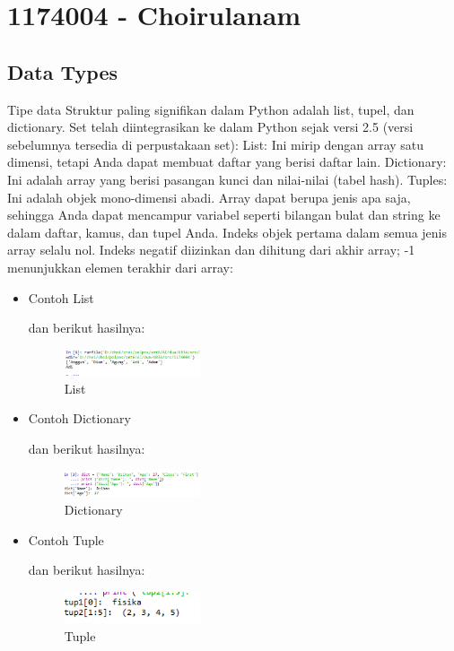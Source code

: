 \section{1174004 - Choirulanam}
\subsection{Data Types}
	\hfill\break
	Tipe data Struktur paling signifikan dalam Python adalah list, tupel, dan dictionary. Set telah diintegrasikan ke dalam Python sejak versi 2.5 (versi sebelumnya tersedia di perpustakaan set): List: Ini mirip dengan array satu dimensi, tetapi Anda dapat membuat daftar yang berisi daftar lain. Dictionary: Ini adalah array yang berisi pasangan kunci dan nilai-nilai (tabel hash). Tuples: Ini adalah objek mono-dimensi abadi. Array dapat berupa jenis apa saja, sehingga Anda dapat mencampur variabel seperti bilangan bulat dan string ke dalam daftar, kamus, dan tupel Anda. Indeks objek pertama dalam semua jenis array selalu nol. Indeks negatif diizinkan dan dihitung dari akhir array; -1 menunjukkan elemen terakhir dari array:

	\begin{itemize}
		\item Contoh List
		\hfill\break
	           
		\hfill\break
		dan berikut hasilnya:
		\begin{figure}[H]
		\includegraphics[width=4cm]{figures/kelompok1/1/anam/list.png}
		\centering
		\caption{List}
		\end{figure}

		\item Contoh Dictionary
		\hfill\break
	           
		\hfill\break
		dan berikut hasilnya:
		\begin{figure}[H]
		\includegraphics[width=4cm]{figures/kelompok1/1/anam/dict.png}
		\centering
		\caption{Dictionary}
		\end{figure}

		\item Contoh Tuple
		\hfill\break
	           
		\hfill\break
		dan berikut hasilnya:
		\begin{figure}[H]
		\includegraphics[width=4cm]{figures/kelompok1/1/anam/tupl.png}
		\centering
		\caption{Tuple}
		\end{figure}
	\end{itemize}

